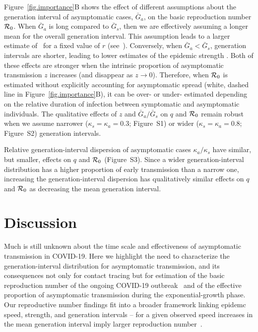 Figure~\ref{fig.importance}B shows the effect of different assumptions about the generation interval of asymptomatic cases, $\bar G_a$, on the basic reproduction number ${\cal{R}}_0$.
When $\bar G_a$ is long compared to $\bar G_s$, then we are effectively assuming a longer mean for the overall generation interval. 
This assumption leads to a larger estimate of \Ro\ for a fixed value of $r$ (see~\citep{park_2019practical}).
Conversely, when $\bar G_a < \bar G_s$, generation intervals are shorter, leading to lower estimates of the epidemic strength \Ro. Both of these effects are stronger when the intrinsic proportion of asymptomatic transmission $z$ increases (and disappear as $z\to0$).
Therefore, when ${\cal{R}}_0$ is estimated without explicitly accounting for asymptomatic spread (white, dashed line in Figure~\ref{fig.importance}B), it can be over- or under- estimated depending on the relative duration of infection between symptomatic and asymptomatic individuals.
The qualitative effects of $z$ and $\bar G_a/\bar G_s$ on $q$ and ${\cal{R}}_0$ remain robust when we assume narrower ($\kappa_s = \kappa_a = 0.3$; Figure~S1) or wider ($\kappa_s = \kappa_a = 0.8$; Figure~S2) generation intervals.

Relative generation-interval dispersion of asymptomatic cases $\kappa_a/\kappa_s$ have similar, but smaller, effects on $q$ and ${\cal{R}}_0$ (Figure~S3).
Since a wider generation-interval distribution has a higher proportion of early transmission than a narrow one, increasing the generation-interval dispersion has qualitatively similar effects on $q$ and ${\cal{R}}_0$ as decreasing the mean generation interval.

\section{Discussion}

Much is still unknown about the time scale and effectiveness of asymptomatic transmission in COVID-19. 
Here we highlight the need to characterize the generation-interval distribution for asymptomatic transmission, and its consequences not only for contact tracing but for estimation of the basic reproduction number of the ongoing COVID-19 outbreak~\citep{park_preprint} and of the effective proportion of asymptomatic transmission during the exponential-growth phase.
Our reproductive number findings fit into a broader framework linking epidemc speed, strength, and generation intervals -- for a given observed speed increases in the mean generation interval imply larger reproduction number~\citep{wallinga2007generation, powers2014impact, park_2019practical}.

